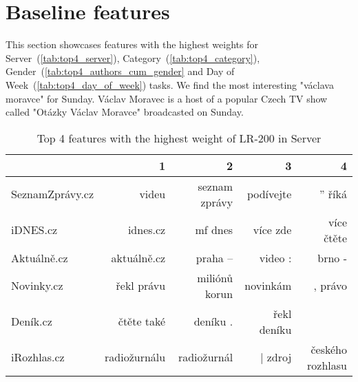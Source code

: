 \chapter{Baseline features}
\label{ch:baseline_features}
This section showcases features with the highest weights for
Server~(\autoref{tab:top4_server}), Category~(\autoref{tab:top4_category}), Gender~(\autoref{tab:top4_authors_cum_gender}
and Day of Week~(\autoref{tab:top4_day_of_week}) tasks.
We find the most interesting "václava moravce" for Sunday. Václav Moravec is a host
of a popular Czech TV show called "Otázky Václav Moravce" broadcasted on Sunday.

\begin{table}
    \centering\footnotesize\sf
    \begin{tabular}{lrrrr}
        \toprule
        {} &             1 &              2 &            3 &                 4 \\
        \midrule
        SeznamZprávy.cz &         videu &  seznam zprávy &    podívejte &            ” říká \\
        iDNES.cz        &      idnes.cz &        mf dnes &     více zde &        více čtěte \\
        Aktuálně.cz     &   aktuálně.cz &        praha – &      video : &            brno - \\
        Novinky.cz      &    řekl právu &  miliónů korun &     novinkám &           , právo \\
        Deník.cz        &    čtěte také &       deníku . &  řekl deníku &                 ­ \\
        iRozhlas.cz     &  radiožurnálu &    radiožurnál &      | zdroj &  českého rozhlasu \\
        \bottomrule
    \end{tabular}
    \caption{Top 4 features with the highest weight of LR-200 in Server}
    \label{tab:top4_server}
\end{table}

